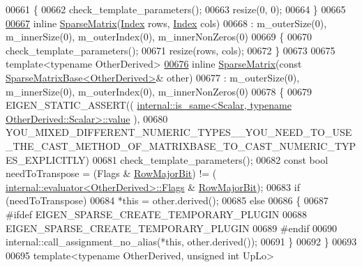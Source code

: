\begin{DoxyCode}
00661     \{
00662       check\_template\_parameters();
00663       resize(0, 0);
00664     \}
00665 
\hyperlink{group___sparse_core___module_a6abf1015a0243be97648e106a17b01ea}{00667}     \textcolor{keyword}{inline} \hyperlink{group___sparse_core___module_a6abf1015a0243be97648e106a17b01ea}{SparseMatrix}(\hyperlink{group___core___module_a554f30542cc2316add4b1ea0a492ff02}{Index} rows, \hyperlink{group___core___module_a554f30542cc2316add4b1ea0a492ff02}{Index} cols)
00668       : m\_outerSize(0), m\_innerSize(0), m\_outerIndex(0), m\_innerNonZeros(0)
00669     \{
00670       check\_template\_parameters();
00671       resize(rows, cols);
00672     \}
00673 
00675     \textcolor{keyword}{template}<\textcolor{keyword}{typename} OtherDerived>
\hyperlink{group___sparse_core___module_a501a50f0d7d58dc4c1d990cd912f581f}{00676}     \textcolor{keyword}{inline} \hyperlink{group___sparse_core___module_a501a50f0d7d58dc4c1d990cd912f581f}{SparseMatrix}(\textcolor{keyword}{const} \hyperlink{group___sparse_core___module_class_eigen_1_1_sparse_matrix_base}{SparseMatrixBase<OtherDerived>}& 
      other)
00677       : m\_outerSize(0), m\_innerSize(0), m\_outerIndex(0), m\_innerNonZeros(0)
00678     \{
00679       EIGEN\_STATIC\_ASSERT((
      \hyperlink{struct_eigen_1_1internal_1_1is__same}{internal::is\_same<Scalar, typename OtherDerived::Scalar>::value}
      ),
00680         
      YOU\_MIXED\_DIFFERENT\_NUMERIC\_TYPES\_\_YOU\_NEED\_TO\_USE\_THE\_CAST\_METHOD\_OF\_MATRIXBASE\_TO\_CAST\_NUMERIC\_TYPES\_EXPLICITLY)
00681       check\_template\_parameters();
00682       \textcolor{keyword}{const} \textcolor{keywordtype}{bool} needToTranspose = (Flags & \hyperlink{group__flags_gae4f56c2a60bbe4bd2e44c5b19cbe8762}{RowMajorBit}) != (
      \hyperlink{struct_eigen_1_1internal_1_1evaluator}{internal::evaluator<OtherDerived>::Flags} & 
      \hyperlink{group__flags_gae4f56c2a60bbe4bd2e44c5b19cbe8762}{RowMajorBit});
00683       \textcolor{keywordflow}{if} (needToTranspose)
00684         *\textcolor{keyword}{this} = other.derived();
00685       \textcolor{keywordflow}{else}
00686       \{
00687 \textcolor{preprocessor}{        #ifdef EIGEN\_SPARSE\_CREATE\_TEMPORARY\_PLUGIN}
00688           EIGEN\_SPARSE\_CREATE\_TEMPORARY\_PLUGIN
00689 \textcolor{preprocessor}{        #endif}
00690         internal::call\_assignment\_no\_alias(*\textcolor{keyword}{this}, other.derived());
00691       \}
00692     \}
00693     
00695     \textcolor{keyword}{template}<\textcolor{keyword}{typename} OtherDerived, \textcolor{keywordtype}{unsigned} \textcolor{keywordtype}{int} UpLo>

\end{DoxyCode}
